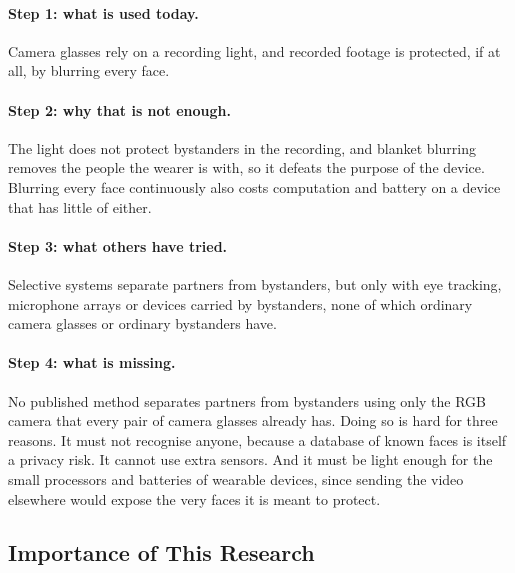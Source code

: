 \paragraph{Step 1: what is used today.}
Camera glasses rely on a recording light, and recorded footage is protected, if at all,
by blurring every face.

\paragraph{Step 2: why that is not enough.}
The light does not protect bystanders in the recording, and blanket blurring removes the
people the wearer is with, so it defeats the purpose of the device. Blurring every face
continuously also costs computation and battery on a device that has little of either.

\paragraph{Step 3: what others have tried.}
Selective systems separate partners from bystanders, but only with eye tracking,
microphone arrays or devices carried by bystanders, none of which ordinary camera glasses
or ordinary bystanders have.

\paragraph{Step 4: what is missing.}
No published method separates partners from bystanders using only the RGB camera that
every pair of camera glasses already has. Doing so is hard for three reasons. It must not
recognise anyone, because a database of known faces is itself a privacy risk. It cannot
use extra sensors. And it must be light enough for the small processors and batteries of
wearable devices, since sending the video elsewhere would expose the very faces it is
meant to protect.

\begin{center}
\end{center}

\subsection{Importance of This Research}
\label{sec:importance}

